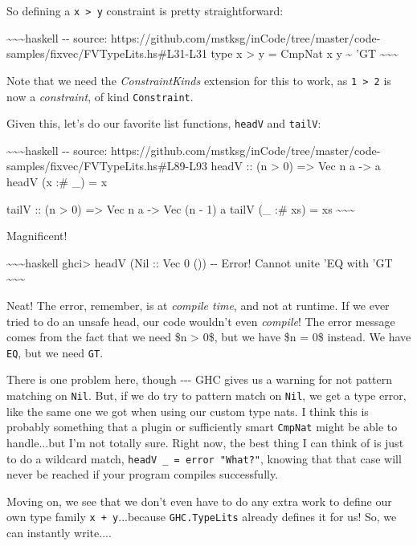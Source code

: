 \documentclass[]{article}
\begin{document}
So defining a \texttt{x\ \textgreater{}\ y} constraint is pretty
straightforward:

\textasciitilde{}\textasciitilde{}\textasciitilde{}haskell -\/- source:
https://github.com/mstksg/inCode/tree/master/code-samples/fixvec/FVTypeLits.hs\#L31-L31
type x \textgreater{} y = CmpNat x y \textasciitilde{} 'GT
\textasciitilde{}\textasciitilde{}\textasciitilde{}

Note that we need the \emph{ConstraintKinds} extension for this to work, as
\texttt{1\ \textgreater{}\ 2} is now a \emph{constraint}, of kind
\texttt{Constraint}.

Given this, let's do our favorite list functions, \texttt{headV} and
\texttt{tailV}:

\textasciitilde{}\textasciitilde{}\textasciitilde{}haskell -\/- source:
https://github.com/mstksg/inCode/tree/master/code-samples/fixvec/FVTypeLits.hs\#L89-L93
headV :: (n \textgreater{} 0) =\textgreater{} Vec n a -\textgreater{} a headV (x
:\# \_) = x

tailV :: (n \textgreater{} 0) =\textgreater{} Vec n a -\textgreater{} Vec (n -
1) a tailV (\_ :\# xs) = xs \textasciitilde{}\textasciitilde{}\textasciitilde{}

Magnificent!

\textasciitilde{}\textasciitilde{}\textasciitilde{}haskell ghci\textgreater{}
headV (Nil :: Vec 0 ()) -\/- Error! Cannot unite 'EQ with 'GT
\textasciitilde{}\textasciitilde{}\textasciitilde{}

Neat! The error, remember, is at \emph{compile time}, and not at runtime. If we
ever tried to do an unsafe head, our code wouldn't even \emph{compile}! The
error message comes from the fact that we need \$n \textgreater{} 0\$, but we
have \$n = 0\$ instead. We have \texttt{EQ}, but we need \texttt{GT}.

There is one problem here, though -\/-\/- GHC gives us a warning for not pattern
matching on \texttt{Nil}. But, if we do try to pattern match on \texttt{Nil}, we
get a type error, like the same one we got when using our custom type nats. I
think this is probably something that a plugin or sufficiently smart
\texttt{CmpNat} might be able to handle...but I'm not totally sure. Right now,
the best thing I can think of is just to do a wildcard match,
\texttt{headV\ \_\ =\ error\ "What?"}, knowing that that case will never be
reached if your program compiles successfully.

Moving on, we see that we don't even have to do any extra work to define our own
type family \texttt{x\ +\ y}...because \texttt{GHC.TypeLits} already defines it
for us! So, we can instantly write....
\end{document}
